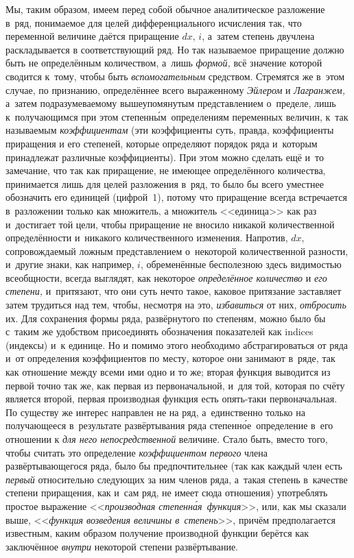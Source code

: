 Мы, таким образом, имеем перед собой обычное аналитическое разложение в~ряд,
понимаемое для целей дифференциального исчисления так, что переменной величине
даётся приращение $dx$, $i$, а~затем степень двучлена раскладывается в
соответствующий ряд. Но так называемое приращение должно быть не определённым
количеством, а~лишь {\em формой,} всё значение которой сводится к~тому, чтобы
быть {\em вспомогательным} средством. Стремятся же в~этом случае, по признанию,
определённее всего выраженному {\em Эйлером} и {\em Лагранжем,} а~затем
подразумеваемому вышеупомянутым представлением о~пределе, лишь к~получающимся
при этом степенн\'{ы}м~определениям переменных величин, к~так называемым
{\em коэффициентам} (эти коэффициенты суть, правда, коэффициенты приращения и
его степеней, которые определяют порядок ряда и~которым принадлежат различные
коэффициенты). При этом можно сделать ещё и~то замечание, что так как
приращение, не имеющее определённого количества, принимается лишь для целей
разложения в~ряд, то было бы всего уместнее обозначить его единицей (цифрой~1),
потому что приращение всегда встречается в~разложении только как множитель, а
множитель <<единица>> как раз и~достигает той цели, чтобы приращение не вносило
никакой количественной определённости и~никакого количественного изменения.
Напротив, $dx$, сопровождаемый ложным представлением о~некоторой количественной
разности, и~другие знаки, как например, $i$, обременённые бесполезною здесь
видимостью всеобщности, всегда выглядят, как некоторое
{\em определённое количество} и {\em его степени,} и~притязают, что они суть
нечто такое, каковое притязание заставляет затем трудиться над тем, чтобы,
несмотря на это, {\em избавиться} от них, {\em отбросить} их. Для сохранения
формы ряда, развёрнутого по степеням, можно было бы с~таким же удобством
присоединять обозначения показателей как indices (индексы) и~к единице. Но и
помимо этого необходимо абстрагироваться от ряда и~от определения коэффициентов
по месту, которое они занимают в~ряде, так как отношение между всеми ими одно и
то же; вторая функция выводится из первой точно так же, как первая из
первоначальной, и~для той, которая по счёту является второй, первая производная
функция есть опять-таки первоначальная. По существу же интерес направлен не на
ряд, а~единственно только на получающееся в~результате развёртывания ряда
степенн\'{о}е~определение в~его отношении к {\em для него непосредственной}
величине. Стало быть, вместо того, чтобы считать это определение
{\em коэффициентом первого} члена развёртывающегося ряда, было бы
предпочтительнее (так как каждый член есть {\em первый} относительно следующих
за ним членов ряда, а~такая степень в~качестве степени приращения, как и~сам
ряд, не имеет сюда отношения) употреблять простое выражение <<{\em производная
степенн\'{а}я~функция}>>, или, как мы сказали выше, <<{\em функция возведения
величины в~степень}>>, причём предполагается известным, каким образом получение
производной функции берётся как заключённое {\em внутри} некоторой степени
развёртывание.

